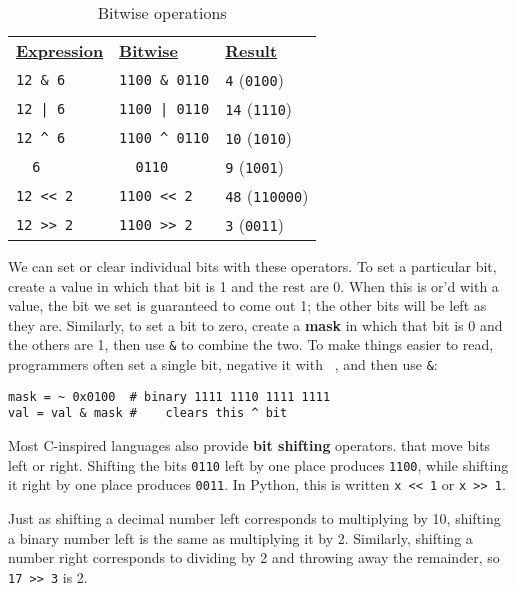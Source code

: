 \documentclass{scrbook}
\newcommand{\glossref}[1]{\textbf{#1}}
\begin{document}
\begin{table}
\begin{tabular}{lll}
\textbf{\underline{Expression}} & \textbf{\underline{Bitwise}} & \textbf{\underline{Result}} \\
\texttt{12 \& 6} & \texttt{1100 \& 0110} & \texttt{4} (\texttt{0100}) \\
\texttt{12 | 6} & \texttt{1100 | 0110} & \texttt{14} (\texttt{1110}) \\
\texttt{12 {\textasciicircum} 6} & \texttt{1100 {\textasciicircum} 0110} & \texttt{10} (\texttt{1010}) \\
\texttt{~ 6} & \texttt{~ 0110} & \texttt{9} (\texttt{1001}) \\
\texttt{12 << 2} & \texttt{1100 << 2} & \texttt{48} (\texttt{110000}) \\
\texttt{12 >> 2} & \texttt{1100 >> 2} & \texttt{3} (\texttt{0011}) \\
\end{tabular}
\caption{Bitwise operations}
\label{binary-ops}
\end{table}



We can set or clear individual bits with these operators.
To set a particular bit,
create a value in which that bit is 1 and the rest are 0.
When this is or'd with a value,
the bit we set is guaranteed to come out 1;
the other bits will be left as they are.
Similarly,
to  set a bit to zero,
create a \glossref{mask} in which that bit is 0 and the others are 1,
then use \texttt{\&} to combine the two.
To make things easier to read,
programmers often set a single bit,
negative it with \texttt{~},
and then use \texttt{\&}:


\begin{lstlisting}[frame=single,frameround=tttt]
mask = ~ 0x0100  # binary 1111 1110 1111 1111
val = val & mask #    clears this ^ bit
\end{lstlisting}



Most C-inspired languages also provide \glossref{bit shifting} operators.
that move bits left or right.
Shifting the bits \texttt{0110} left by one place produces \texttt{1100},
while shifting it right by one place produces \texttt{0011}.
In Python,
this is written \texttt{x << 1} or \texttt{x >> 1}.


Just as shifting a decimal number left corresponds to multiplying by 10,
shifting a binary number left is the same as multiplying it by 2.
Similarly,
shifting a number right corresponds to dividing by 2 and throwing away the remainder,
so \texttt{17 >> 3} is 2.
\end{document}
